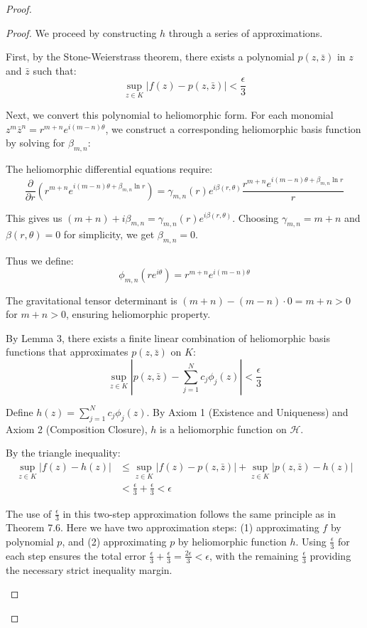 \begin{proof}
\begin{proof}
We proceed by constructing $h$ through a series of approximations.

First, by the Stone-Weierstrass theorem, there exists a polynomial $p(z, \bar{z})$ in $z$ and $\bar{z}$ such that:
\begin{equation}
\sup_{z \in K} |f(z) - p(z, \bar{z})| < \frac{\epsilon}{3}
\end{equation}

Next, we convert this polynomial to heliomorphic form. For each monomial $z^m\bar{z}^n = r^{m+n}e^{i(m-n)\theta}$, we construct a corresponding heliomorphic basis function by solving for $\beta_{m,n}$:

The heliomorphic differential equations require:
$$\frac{\partial}{\partial r}\left(r^{m+n}e^{i(m-n)\theta + \beta_{m,n}\ln r}\right) = \gamma_{m,n}(r)e^{i\beta(r,\theta)}\frac{r^{m+n}e^{i(m-n)\theta + \beta_{m,n}\ln r}}{r}$$

This gives us $(m+n) + i\beta_{m,n} = \gamma_{m,n}(r)e^{i\beta(r,\theta)}$. Choosing $\gamma_{m,n} = m+n$ and $\beta(r,\theta) = 0$ for simplicity, we get $\beta_{m,n} = 0$.

Thus we define:
\begin{equation}
\phi_{m,n}(re^{i\theta}) = r^{m+n}e^{i(m-n)\theta}
\end{equation}

The gravitational tensor determinant is $(m+n) - (m-n) \cdot 0 = m+n > 0$ for $m+n > 0$, ensuring heliomorphic property.

By Lemma 3, there exists a finite linear combination of heliomorphic basis functions that approximates $p(z, \bar{z})$ on $K$:
\begin{equation}
\sup_{z \in K} |p(z, \bar{z}) - \sum_{j=1}^{N} c_j\phi_j(z)| < \frac{\epsilon}{3}
\end{equation}

Define $h(z) = \sum_{j=1}^{N} c_j\phi_j(z)$. By Axiom 1 (Existence and Uniqueness) and Axiom 2 (Composition Closure), $h$ is a heliomorphic function on $\mathcal{H}$.

By the triangle inequality:
\begin{align}
\sup_{z \in K} |f(z) - h(z)| &\leq \sup_{z \in K} |f(z) - p(z, \bar{z})| + \sup_{z \in K} |p(z, \bar{z}) - h(z)|\\
&< \frac{\epsilon}{3} + \frac{\epsilon}{3} < \epsilon
\end{align}

\begin{remark}
The use of $\frac{\epsilon}{3}$ in this two-step approximation follows the same principle as in Theorem 7.6. Here we have two approximation steps: (1) approximating $f$ by polynomial $p$, and (2) approximating $p$ by heliomorphic function $h$. Using $\frac{\epsilon}{3}$ for each step ensures the total error $\frac{\epsilon}{3} + \frac{\epsilon}{3} = \frac{2\epsilon}{3} < \epsilon$, with the remaining $\frac{\epsilon}{3}$ providing the necessary strict inequality margin.
\end{remark}


\end{proof}
\end{proof}

